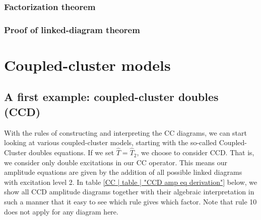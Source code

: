 \documentclass[10pt]{report}
\begin{document}
	\subsubsection{Factorization theorem}
	
	\subsubsection{Proof of linked-diagram theorem}
	
	\section{Coupled-cluster models}
	\subsection{A first example: coupled-cluster doubles (CCD)}
	With the rules of constructing and interpreting the CC diagrams, we can start looking at various coupled-cluster models, starting with the so-called Coupled-Cluster doubles equations. If we set $\hat{T} = \hat{T}_2$, we choose to consider CCD. That is, we consider only double excitations in our CC operator. This means our amplitude equations are given by the addition of all possible linked diagrams with excitation level 2. In table \ref{CC | table | "CCD amp eq derivation"} below, we show all CCD amplitude diagrams together with their algebraic interpretation in such a manner that it easy to see which rule gives which factor. Note that rule 10 does not apply for any diagram here.
	
\end{document}
